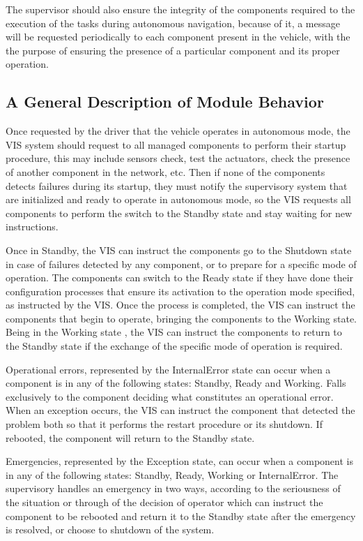 \documentclass[conference]{IEEEtran}
\begin{document}
The supervisor should also ensure the integrity of the components required to the execution of the tasks during autonomous navigation, because of it, a message will be requested periodically to each component present in the vehicle, with the the purpose of ensuring the presence of a particular component and its proper operation.

%
\subsection{A General Description of Module Behavior}\label{subsec:module_behavior}

Once requested by the driver that the vehicle operates in autonomous mode, the VIS system should request to all managed components to perform their startup procedure, this may include sensors check, test the actuators, check the presence of another component in the network, etc. Then if none of the components detects failures during its startup, they must notify the supervisory system that are initialized and ready to operate in autonomous mode, so the VIS requests all components to perform the switch to the Standby state and stay waiting for new instructions.

Once in Standby, the VIS can instruct the components go to the Shutdown state in case of failures detected by any component, or to prepare for a specific mode of operation. The components can switch to the Ready state if they have done their configuration processes that ensure its activation to the operation mode specified, as instructed by the VIS. Once the process is completed, the VIS can instruct the components that begin to operate, bringing the components to the Working state. Being in the Working state , the VIS can instruct the components to return to the Standby state if the exchange of the specific mode of operation is required.

Operational errors, represented by the InternalError state can occur when a component is in any of the following states: Standby, Ready and Working. Falls exclusively to the component deciding what constitutes an operational error. When an exception occurs, the VIS can instruct the component that detected the problem both so that it performs the restart procedure or its shutdown. If rebooted, the component will return to the Standby state.

Emergencies, represented by the Exception state, can occur when a component is in any of the following states: Standby, Ready, Working or InternalError. The supervisory handles an emergency in two ways, according to the seriousness of the situation or through of the decision of operator which can instruct the component to be rebooted and return it to the Standby state after the emergency is resolved, or choose to shutdown of the system.
\end{document}
